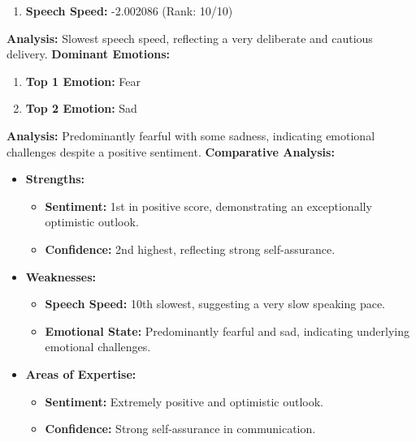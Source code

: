 \documentclass{article}
\begin{document}
\begin{tcolorbox}[ colback=cyan!5!white, colframe=cyan!75!black,  title=Speech Speed]
    \begin{enumerate}
        \item \textbf{Speech Speed:} \textcolor{purple!70!black}{-2.002086} (Rank: 10/10)
    \end{enumerate}
\end{tcolorbox}
    \textbf{Analysis:} Slowest speech speed, reflecting a very deliberate and cautious delivery.
    \vspace{0.1in}
\large{\textbf{Dominant Emotions:}}
\begin{tcolorbox}[colback=blue!5!white,colframe=blue!75!black,title=Emotional State]
    \begin{enumerate}
        \item \textbf{Top 1 Emotion:} \textcolor{red!80!black}{Fear}
        \item \textbf{Top 2 Emotion:} \textcolor{blue!80!black}{Sad}
    \end{enumerate}
\end{tcolorbox}
    \textbf{Analysis:} Predominantly fearful with some sadness, indicating emotional challenges despite a positive sentiment.
    \vspace{0.2in}
\textbf{Comparative Analysis:}
\begin{itemize}
    \item \textbf{Strengths:}
    \begin{itemize}
        \item \textbf{Sentiment:} 1st in positive score, demonstrating an exceptionally optimistic outlook.
        \item \textbf{Confidence:} 2nd highest, reflecting strong self-assurance.
    \end{itemize}
    \item \textbf{Weaknesses:}
    \begin{itemize}
        \item \textbf{Speech Speed:} 10th slowest, suggesting a very slow speaking pace.
        \item \textbf{Emotional State:} Predominantly fearful and sad, indicating underlying emotional challenges.
    \end{itemize}
    \item \textbf{Areas of Expertise:}
    \begin{itemize}
        \item \textbf{Sentiment:} Extremely positive and optimistic outlook.
        \item \textbf{Confidence:} Strong self-assurance in communication.
    \end{itemize}
\end{itemize}
\end{document}
